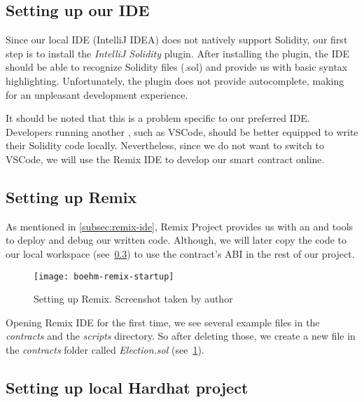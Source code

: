 \subsection{Setting up our IDE}\label{subsec:setting-up-our-ide}

Since our local \gls{IDE} (IntelliJ IDEA) does not natively support Solidity, our first step is to install the \emph{IntelliJ Solidity} plugin.
After installing the plugin, the \gls{IDE} should be able to recognize Solidity files (.sol) and provide us with basic syntax highlighting.
Unfortunately, the plugin does not provide autocomplete, making for an unpleasant development experience.

It should be noted that this is a problem specific to our preferred \gls{IDE}.
Developers running another , such as VSCode, should be better equipped to write their Solidity code locally.
Nevertheless, since we do not want to switch to VSCode, we will use the Remix \gls{IDE} to develop our smart contract online.

\subsection{Setting up Remix}\label{subsec:setting-up-remix}

As mentioned in \cref{subsec:remix-ide}, Remix Project provides us with an  and tools to deploy and debug our written code.
Although, we will later copy the code to our local workspace (see~\cref{subsec:setting-up-local-hardhat-project}) to use the contract's \gls{ABI} in the rest of our project.

\begin{figure}[h]
    \centering
    \texttt{[image: boehm-remix-startup]}
    \caption[Setting up Remix]{Setting up Remix. Screenshot taken by author}
    \label{fig:remix-setup}
\end{figure}

Opening Remix \gls{IDE} for the first time, we see several example files in the \emph{contracts} and the \emph{scripts} directory.
So after deleting those, we create a new file in the \emph{contracts} folder called \emph{Election.sol} (see~\cref{fig:remix-setup}).

\subsection{Setting up local Hardhat project}\label{subsec:setting-up-local-hardhat-project}

